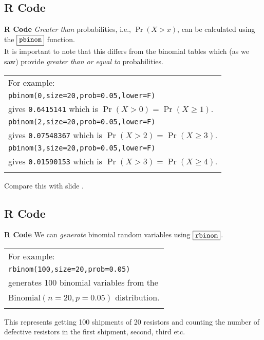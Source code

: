 \documentclass[compress]{beamer}        %
\makeatletter
\newcommand{\tcb}{\textcolor{beamer@blendedblue}}
\makeatother
\begin{document}
\subsection{R Code}
\begin{frame}{\bf \tcb{R Code}}
\emph{Greater than} probabilities, i.e., $\Pr(X > x)$, can be calculated using the $\boxed{\text{\texttt{pbinom}}}$ function.\\[0.4cm]
It is important to note that this differs from the binomial tables which (as we saw) provide \emph{greater than or equal to} probabilities.\\[0.4cm]

\begin{tabular}{|l|}
\hline
For example:\\[0.1cm]
\texttt{pbinom(0,size=20,prob=0.05,lower=F)} \\
gives \texttt{0.6415141} which is $\Pr(X > 0) = \Pr(X \ge 1)$.\\[0.2cm]
\texttt{pbinom(2,size=20,prob=0.05,lower=F)} \\
gives \texttt{0.07548367} which is $\Pr(X > 2) = \Pr(X \ge 3)$.\\[0.2cm]
\texttt{pbinom(3,size=20,prob=0.05,lower=F)} \\
gives \texttt{0.01590153} which is $\Pr(X > 3) = \Pr(X \ge 4)$.\\
\hline
\multicolumn{1}{c}{}\\[0.0cm]
\end{tabular}

Compare this with slide \pageref{binexampletab}.
\end{frame}



\subsection{R Code}
\begin{frame}{\bf \tcb{R Code}}
We can \emph{generate} binomial random variables using $\boxed{\text{\texttt{rbinom}}}$.\\[0.5cm]

\begin{tabular}{|l|}
\hline
For example:\\[0.2cm]
\texttt{rbinom(100,size=20,prob=0.05)} \\
generates 100 binomial variables from the\\
Binomial$(n=20,p=0.05)$ distribution.\\
\hline
\multicolumn{1}{c}{}\\[0.2cm]
\end{tabular}

This represents getting 100 shipments of 20 resistors and counting the number of defective resistors in the first shipment, second, third etc.

\end{frame}
\end{document}
